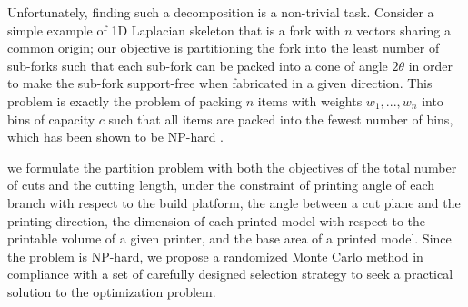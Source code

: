 Unfortunately, finding such a decomposition is a non-trivial task. Consider a simple example of 1D Laplacian skeleton that is a fork with $n$ vectors sharing a common origin; our objective is partitioning the fork into the least number of sub-forks such that each sub-fork can be packed into a cone of angle $2\theta$ in order to make the sub-fork support-free when fabricated in a given direction. This problem is exactly the problem of packing $n$ items with weights $w_1, ..., w_n$ into bins of capacity $c$ such that all items are packed into the fewest number of bins, which has been shown to be NP-hard \cite{Fukunaga:2007}.

we formulate the partition problem with both the objectives of the total number of cuts and the cutting length, under the constraint of printing angle of each branch with respect to the build platform, the angle between a cut plane and the printing direction, the dimension of each printed model with respect to the printable volume of a given printer, and the base area of a printed model. Since the problem is NP-hard, we propose a randomized Monte Carlo method in compliance with a set of carefully designed selection strategy to seek a practical solution to the optimization problem.
